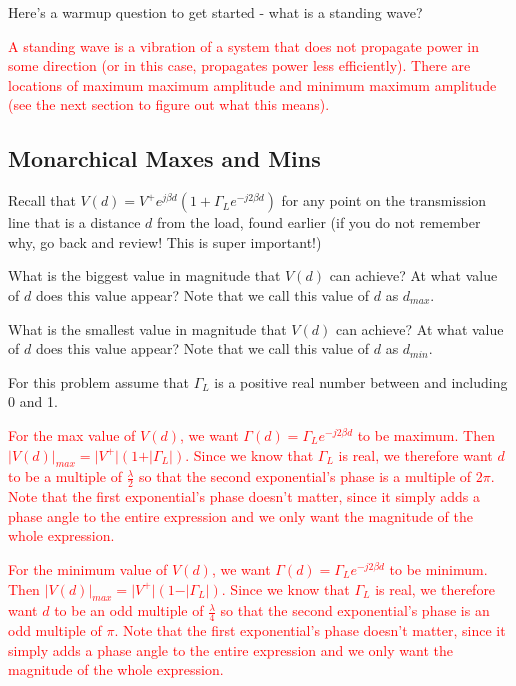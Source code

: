 \documentclass{article}
\begin{document}
Here's a warmup question to get started - what is a standing wave?

\textcolor{red}{A standing wave is a vibration of a system  that does not propagate power in some direction (or in this case, propagates power less efficiently). There are locations of maximum maximum amplitude and minimum maximum amplitude (see the next section to figure out what this means).}

\vfill

\subsection{Monarchical Maxes and Mins}

Recall that $V(d) = V^+ e^{j \beta d} (1 + \Gamma_L e^{-j2\beta d})$ for any point on the transmission line that is a distance $d$ from the load, found earlier (if you do not remember why, go back and review! This is super important!)

What is the biggest value in magnitude that $V(d)$ can achieve? At what value of $d$ does this value appear? Note that we call this value of $d$ as $d_{max}$.

What is the smallest value in magnitude that $V(d)$ can achieve? At what value of $d$ does this value appear? Note that we call this value of $d$ as $d_{min}$.

For this problem assume that $\Gamma_L$ is a positive real number between and including 0 and 1.

\textcolor{red}{For the max value of $V(d)$, we want $\Gamma(d) = \Gamma_L e^{-j2\beta d}$ to be maximum. Then $\vert V(d) \vert_{max} = \vert V^+ \vert (1 + \vert \Gamma_L \vert)$. Since we know that $\Gamma_L$ is real, we therefore want $d$ to be a multiple of $\frac{\lambda}{2}$ so that the second exponential's phase is a multiple of $2 \pi$. Note that the first exponential's phase doesn't matter, since it simply adds a phase angle to the entire expression and we only want the magnitude of the whole expression.}

\textcolor{red}{For the minimum value of $V(d)$, we want $\Gamma(d) = \Gamma_L e^{-j2\beta d}$ to be minimum. Then $\vert V(d) \vert_{max} = \vert V^+ \vert (1 - \vert \Gamma_L \vert)$. Since we know that $\Gamma_L$ is real, we therefore want $d$ to be an odd multiple of $\frac{\lambda}{4}$ so that the second exponential's phase is an odd multiple of $\pi$. Note that the first exponential's phase doesn't matter, since it simply adds a phase angle to the entire expression and we only want the magnitude of the whole expression.}
\end{document}
